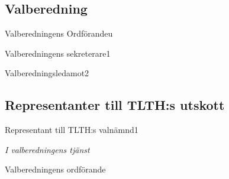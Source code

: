 \documentclass[10pt]{article}
\begin{document}
    \subsection{Valberedning}
    \begin{vallista}
        \begin{post}{Valberedningens Ordförande}{u}
        \end{post}
        \begin{post}{Valberedningens sekreterare}{1}
        \end{post}
        \begin{post}{Valberedningsledamot}{2}
        \end{post}
    \end{vallista}
    
    \subsection{Representanter till TLTH:s utskott}
    \begin{vallista}
        \begin{post}{Representant till TLTH:s valnämnd}{1}
            \vakant
        \end{post}
    \end{vallista}
    
    \begin{signatures}{1}
    \emph{I valberedningens tjänst}
    \signature{Christian Benson}{Valberedningens ordförande}
    \end{signatures}
    
    
\end{document}
